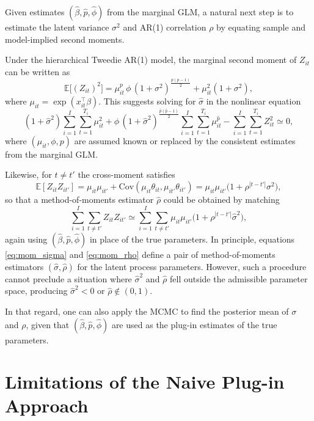 \documentclass{sfuthesis}
\numberwithin{equation}{chapter}
\begin{document}
Given estimates $(\hat\beta, \hat p, \hat\phi)$ from the marginal GLM, a
natural next step is to estimate the latent variance $\sigma^2$ and AR(1)
correlation $\rho$ by equating sample and model-implied second moments.

Under the hierarchical Tweedie AR(1) model, the marginal second moment of
$Z_{it}$ can be written as
\[
\mathbb{E}\big[(Z_{it})^2\big]
= \mu_{it}^{p} \, \phi \,(1 + \sigma^2)^{\frac{p(p-1)}{2}}
  + \mu_{it}^{2} (1 + \sigma^2),
\]
where $\mu_{it} = \exp(x_{it}^\top \beta)$. This suggests solving for
$\hat\sigma$ in the nonlinear equation
\begin{equation}
(1+\hat{\sigma}^2)\sum_{i=1}^I \sum_{t=1}^{T_i}\mu_{it}^2
+ \hat{\phi}\,(1+\hat{\sigma}^2)^{\frac{\hat{p}(\hat{p}-1)}{2}}
  \sum_{i=1}^I  \sum_{t=1}^{T_i} \mu^{\hat{p}}_{it}
- \sum_{i=1}^I \sum_{t=1}^{T_i} Z_{it }^2 \simeq 0,
\label{eq:mom_sigma}
\end{equation}
where $(\mu_{it}, \phi, p)$ are assumed known or replaced by the consistent
estimates from the marginal GLM.

Likewise, for $t \neq t'$ the cross-moment satisfies
\[
\mathbb{E}[Z_{it} Z_{it'}]
= \mu_{it}\mu_{it'} + \mathrm{Cov}(\mu_{it}\theta_{it},
                                   \mu_{it'}\theta_{it'})
= \mu_{it}\mu_{it'} \big(1 + \rho^{|t-t'|} \sigma^2\big),
\]
so that a method-of-moments estimator $\hat\rho$ could be obtained by
matching
\begin{equation}
\sum_{i=1}^I \sum_{t \ne t'} Z_{it}Z_{it'}
\simeq
\sum_{i=1}^I \sum_{t \ne t'} \mu_{it}\mu_{it'}
 \big(1+\rho^{|t-t'|}\hat{\sigma}^2\big),
\label{eq:mom_rho}
\end{equation}
again using $(\hat\beta, \hat p, \hat\phi)$ in place of the true parameters.
In principle, equations \eqref{eq:mom_sigma} and \eqref{eq:mom_rho} define a
pair of method-of-moments estimators $(\hat\sigma, \hat\rho)$ for the latent
process parameters. However, such a procedure cannot preclude a situation where $\hat\sigma^2$ and $\hat\rho$ fell outside the admissible parameter
space, producing $\hat\sigma^2 < 0$ or $\hat\rho \notin (0,1)$. 

In that regard, one can also apply the MCMC to find the posterior mean of $\sigma$ and $\rho$, given that  $(\hat\beta, \hat p, \hat\phi)$ are used as the plug-in estimates of the true parameters.


\section{Limitations of the Naive Plug-in Approach}
\label{subsec:naive_limit}
\end{document}
